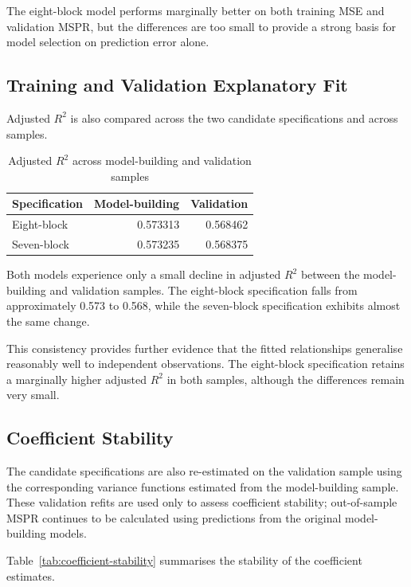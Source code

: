 \documentclass[11pt,a4paper]{article}
\begin{document}
The eight-block model performs marginally better on both training MSE and validation MSPR, but the differences are too small to provide a strong basis for model selection on prediction error alone.

\subsection{Training and Validation Explanatory Fit}

Adjusted \(R^2\) is also compared across the two candidate specifications and across samples.

\begin{table}[H]
\centering
\caption{Adjusted \(R^2\) across model-building and validation samples}
\label{tab:validation-adjusted-r2}
\begin{tabular}{lrr}
\toprule
\textbf{Specification} & \textbf{Model-building} & \textbf{Validation} \\
\midrule
Eight-block & 0.573313 & 0.568462 \\
Seven-block & 0.573235 & 0.568375 \\
\bottomrule
\end{tabular}
\end{table}

Both models experience only a small decline in adjusted \(R^2\) between the model-building and validation samples. The eight-block specification falls from approximately 0.573 to 0.568, while the seven-block specification exhibits almost the same change.

This consistency provides further evidence that the fitted relationships generalise reasonably well to independent observations. The eight-block specification retains a marginally higher adjusted \(R^2\) in both samples, although the differences remain very small.

\subsection{Coefficient Stability}

The candidate specifications are also re-estimated on the validation sample using the corresponding variance functions estimated from the model-building sample. These validation refits are used only to assess coefficient stability; out-of-sample MSPR continues to be calculated using predictions from the original model-building models.

Table~\ref{tab:coefficient-stability} summarises the stability of the coefficient estimates.
\end{document}
